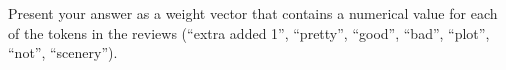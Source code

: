 \documentclass{article}
\renewcommand{\vec}[1]{\underline{#1}}
\theoremstyle{definition}
\newtheorem*{answer}{Answer}
\begin{document}
\begin{question}[start=0]
		Present your answer as a weight vector that contains a numerical value for each of the tokens in the reviews  (``extra added 1'', ``pretty'', ``good'', ``bad'', ``plot'', ``not'', ``scenery'').
%			


\end{question}
\end{document}
